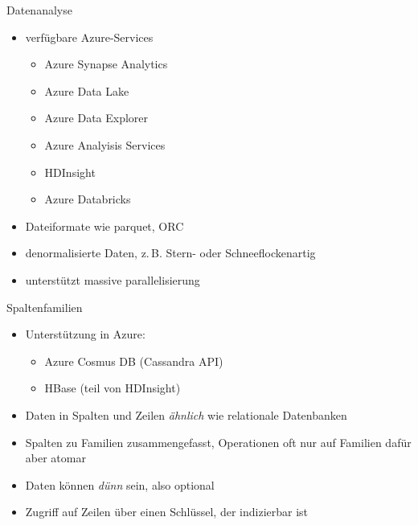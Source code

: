 \begin{flashcard}[Definition]{Datenanalyse}
  \begin{itemize}
    \item verfügbare Azure-Services
      \begin{itemize}
        \item Azure Synapse Analytics
        \item Azure Data Lake
        \item Azure Data Explorer
        \item Azure Analyisis Services
        \item HDInsight
        \item Azure Databricks
      \end{itemize}
    \item Dateiformate wie parquet, ORC
    \item denormalisierte Daten, z.\,B. Stern- oder Schneeflockenartig
    \item unterstützt massive parallelisierung
  \end{itemize}
\end{flashcard}

\begin{flashcard}[Definition]{Spaltenfamilien}
  \begin{itemize}
    \item Unterstützung in Azure:
      \begin{itemize}
         \item Azure Cosmus DB (Cassandra API)
         \item HBase (teil von HDInsight)
      \end{itemize}
    \item Daten in Spalten und Zeilen \emph{ähnlich} wie relationale Datenbanken
    \item Spalten zu Familien zusammengefasst, Operationen oft nur auf Familien\newline
    dafür aber atomar
    \item Daten können \emph{dünn} sein, also optional
    \item Zugriff auf Zeilen über einen Schlüssel, der indizierbar ist
  \end{itemize}
\end{flashcard}

